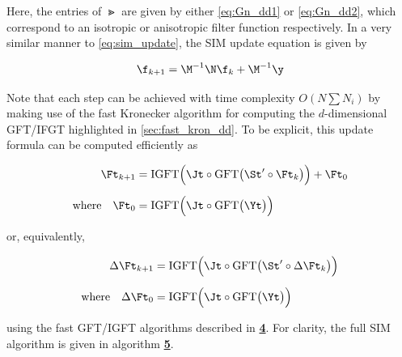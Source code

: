 Here, the entries of $\Gt$ are given by either \cref{eq:Gn_dd1} or \cref{eq:Gn_dd2}, which correspond to an isotropic or anisotropic filter function respectively. In a very similar manner to \cref{eq:sim_update}, the SIM update equation is given by 

\begin{equation}
    \label{eq:sim_update_dd}
    \f_{k+1} = \M^{-1}\N \f_{k} + \M^{-1} \y
\end{equation}

Note that each step can be achieved with time complexity $O(N \sum N_i)$ by making use of the fast Kronecker algorithm for computing the $d$-dimensional GFT/IFGT highlighted in \cref{sec:fast_kron_dd}. To be explicit, this update formula can be computed efficiently as 

\begin{align*}
    \Ft_{k+1} &= \text{IGFT} \Big( \Jt \circ \text{GFT}\big(\St' \circ \Ft_{k}\big)\Big)  + \Ft_{0} \\[0.2cm]
    \text{where} \quad \Ft_{0} &= \text{IGFT} \Big( \Jt \circ \text{GFT}\big(\Yt \big)\Big) 
\end{align*}

or, equivalently,

\begin{align*}
    \Delta \Ft_{k+1} &= \text{IGFT}  \Big( \Jt \circ \text{GFT}\big(\St' \circ \Delta \Ft_{k}\big)\Big)  \\[0.2cm]
    \text{where} \quad \Delta \Ft_{0} &= \text{IGFT} \Big( \Jt \circ \text{GFT}\big(\Yt \big)\Big)  
\end{align*}

using the fast GFT/IGFT algorithms described in \hyperlink{al:GFT_dd}{\textbf{4}}. For clarity, the full SIM algorithm is given in algorithm \hyperlink{al:SIM_dd}{\textbf{5}}. 

